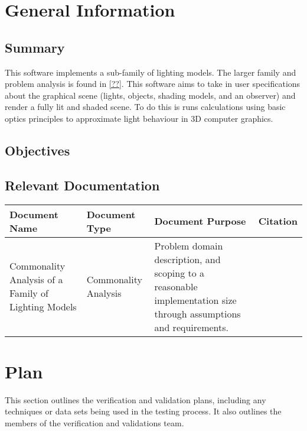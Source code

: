 \documentclass[12pt, titlepage]{article}
\begin{document}
\section{General Information}

\subsection{Summary}
This software implements a sub-family of lighting models. The larger family and 
problem analysis is found in \ref{??}. This software aims to take in user 
specifications about the graphical scene (lights, objects, shading models, and 
an observer) and render a fully lit and shaded scene. To do this is runs 
calculations using basic optics principles to approximate light behaviour in 3D 
computer graphics.

\subsection{Objectives}


\subsection{Relevant Documentation}

\begin{table}[h]
	\begin{tabular}{|p{3.5cm}|p{3cm}|p{5cm}|l|}
		\hline
	\textbf{Document Name} & \textbf{Document Type} & \textbf{Document Purpose} 
	& \textbf{Citation} \\
		\hline
		Commonality Analysis of a Family of Lighting Models& Commonality 
		Analysis & Problem domain description, and scoping to a reasonable 
		implementation size through assumptions and requirements. & \\ 
		\hline
	\end{tabular}
\end{table}

\section{Plan}
This section outlines the verification and validation plans, including any 
techniques or data sets being used in the testing process. It also outlines the 
members of the verification and validations team.
	
\end{document}
